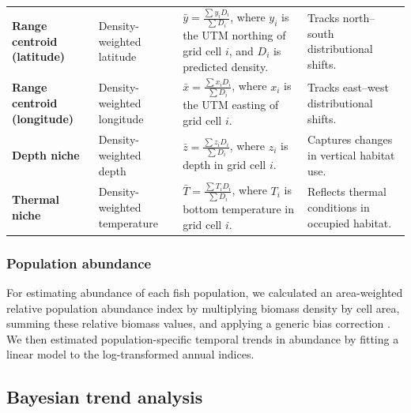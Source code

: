 \documentclass[11pt]{article}
\begin{document}
\begin{spacing}{1.5}
\begin{table}[h!]
\begin{tabular}{
    >{\raggedright\arraybackslash}p{3.2cm} 
    >{\raggedright\arraybackslash}p{3.5cm} 
    >{\raggedright\arraybackslash}p{5cm} 
    >{\raggedright\arraybackslash}p{4.3cm}
}
\textbf{Range centroid (latitude)} & Density-weighted latitude & 
$\bar{y} = \frac{\sum y_i D_i}{\sum D_i}$, where $y_i$ is the UTM northing of grid cell $i$, and $D_i$ is predicted density. & 
Tracks north–south distributional shifts. \\

\textbf{Range centroid (longitude)} & Density-weighted longitude & 
$\bar{x} = \frac{\sum x_i D_i}{\sum D_i}$, where $x_i$ is the UTM easting of grid cell $i$. & 
Tracks east–west distributional shifts. \\

\textbf{Depth niche} & Density-weighted depth & 
$\bar{z} = \frac{\sum z_i D_i}{\sum D_i}$, where $z_i$ is depth in grid cell $i$. & 
Captures changes in vertical habitat use. \\

\textbf{Thermal niche} & Density-weighted temperature & 
$\bar{T} = \frac{\sum T_i D_i}{\sum D_i}$, where $T_i$ is bottom temperature in grid cell $i$. & 
Reflects thermal conditions in occupied habitat. \\

\bottomrule
\end{tabular}
\label{table:derived_quantities}
\end{table}

\subsubsection{Population abundance}

For estimating abundance of each fish population, we calculated an area-weighted relative population abundance index by multiplying biomass density by cell area, summing these relative biomass values, and applying a generic bias correction \citep{thorson_geostatistical_2015, thorsonImplementingGeneric2016}. We then estimated population-specific temporal trends in abundance by fitting a linear model to the log-transformed annual indices.

\subsection{Bayesian trend analysis}\label{sec:Bayesian trend analysis}


\end{spacing}
\end{document}
